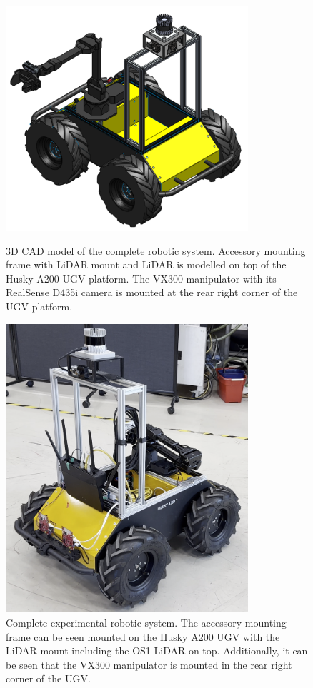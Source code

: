 \begin{figure}[htp!]
  \centering
  \begin{minipage}[b]{0.49\textwidth}
    \centering
    \includegraphics[width = 0.8\textwidth]{Figures/husky_completed.pdf}
    \caption{3D CAD model of the complete robotic system. Accessory mounting frame with LiDAR mount and LiDAR is modelled on top of the Husky A200 UGV platform. The VX300 manipulator with its RealSense D435i camera is mounted at the rear right corner of the UGV platform.}
    \label{fig:M:H:CHS:CadHuskyComplete}
  \end{minipage}
  \hfill
  \begin{minipage}[b]{0.49\textwidth}
    \centering
    \includegraphics[width = 0.8\textwidth]{Figures/figHuskyComplete.png}
    \caption{Complete experimental robotic system. The accessory mounting frame can be seen mounted on the Husky A200 UGV with the LiDAR mount including the OS1 LiDAR on top. Additionally, it can be seen that the VX300 manipulator is mounted in the rear right corner of the UGV.}
    \label{fig:M:H:CHS:PhysHuskyComplete}
  \end{minipage}
\end{figure}

